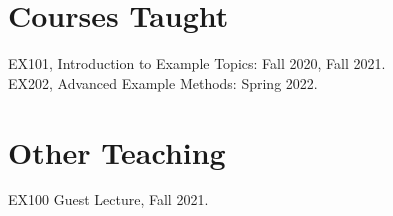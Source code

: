 \section{\sc Courses Taught}
EX101, Introduction to Example Topics: Fall 2020, Fall 2021.\\
EX202, Advanced Example Methods: Spring 2022.

\section{\sc Other Teaching}
EX100 Guest Lecture, Fall 2021.
